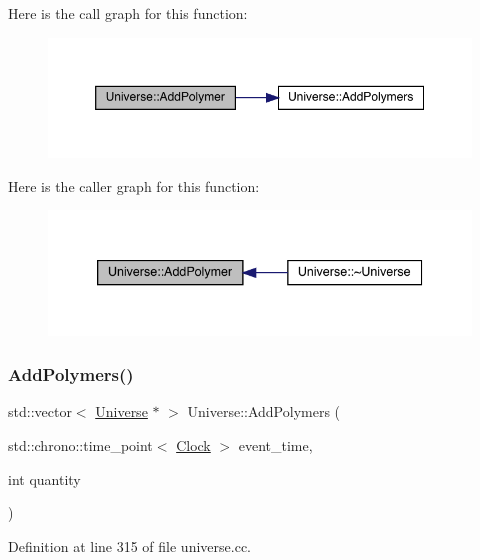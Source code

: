 Here is the call graph for this function\+:
\nopagebreak
\begin{figure}[H]
\begin{center}
\leavevmode
\includegraphics[width=350pt]{class_universe_a4ea0af5d2eb7b5070a83f7da29526fbd_cgraph}
\end{center}
\end{figure}
Here is the caller graph for this function\+:
\nopagebreak
\begin{figure}[H]
\begin{center}
\leavevmode
\includegraphics[width=339pt]{class_universe_a4ea0af5d2eb7b5070a83f7da29526fbd_icgraph}
\end{center}
\end{figure}
\mbox{\label{class_universe_aed7cb25507d516a2821ebb69d5345c54}} 
\subsubsection{\texorpdfstring{Add\+Polymers()}{AddPolymers()}}
{\footnotesize\ttfamily std\+::vector$<$ \hyperlink{class_universe}{Universe} $\ast$ $>$ Universe\+::\+Add\+Polymers (\begin{DoxyParamCaption}\item[{std\+::chrono\+::time\+\_\+point$<$ \hyperlink{universe_8h_a0ef8d951d1ca5ab3cfaf7ab4c7a6fd80}{Clock} $>$}]{event\+\_\+time,  }\item[{int}]{quantity }\end{DoxyParamCaption})}



Definition at line 315 of file universe.\+cc.

